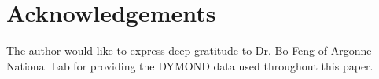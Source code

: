 \section*{Acknowledgements}
\label{acknow}
The author would like to express deep gratitude to Dr. Bo Feng of
Argonne National Lab for providing the DYMOND data used throughout this 
paper.
